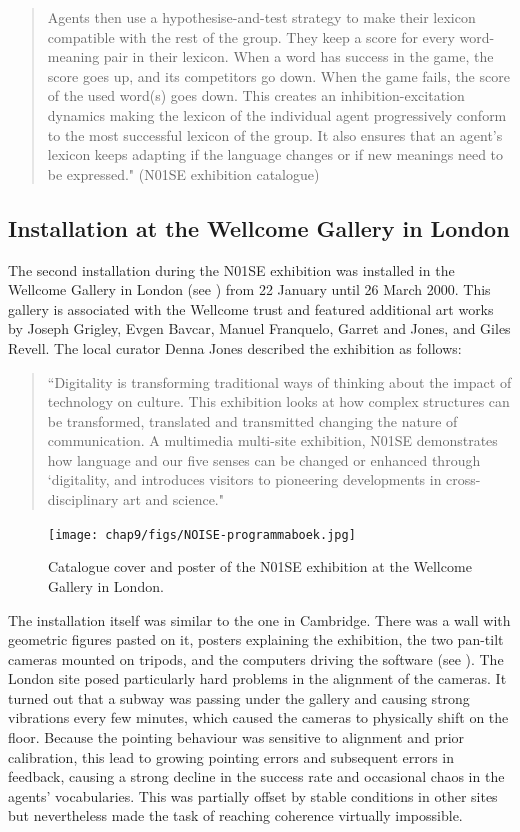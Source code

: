 \begin{quotation}
Agents then use a hypothesise-and-test strategy to make their lexicon compatible with the rest of the group. They keep a score for every word-meaning pair in their lexicon. When a word has success in the game, the score goes up, and its competitors go down. When the game fails, the score of the used word(s) goes down. This creates an inhibition-excitation dynamics making the lexicon of the individual agent progressively conform to the most successful lexicon of the group. It also ensures that an agent's lexicon keeps adapting if the language changes or if new meanings need to be expressed." (N01SE exhibition catalogue)
\end{quotation}

\subsection{Installation at the Wellcome Gallery in London} 

The second installation during the N01SE exhibition was installed in the Wellcome Gallery in London 
(see ) 
from 22 January until 26 March 2000. This gallery is associated with the Wellcome trust and featured additional 
art works by Joseph Grigley, Evgen Bavcar, Manuel Franquelo, Garret and Jones, and Giles Revell. The local curator
Denna Jones described the exhibition as follows: 

\begin{quotation}
``Digitality is transforming traditional ways of thinking about the impact of technology on culture. This exhibition 
looks at how complex structures can be transformed, translated and transmitted changing the nature of communication. 
A multimedia multi-site exhibition, N01SE demonstrates how language and our five senses can be changed or 
enhanced through `digitality, and introduces visitors to pioneering developments in cross-disciplinary art and 
science."
\end{quotation}

\begin{figure}[htbp]
  \centerline{\texttt{[image: chap9/figs/NOISE-programmaboek.jpg]}}
\caption{\label{fig:program}Catalogue cover and poster of the N01SE exhibition at the Wellcome Gallery in London.}
\end{figure}

The installation itself was similar to the one in Cambridge. There was a wall with 
geometric figures pasted on it, posters explaining the exhibition, the two pan-tilt cameras mounted on tripods, 
and the computers driving the software (see ). The London site posed particularly hard 
problems in the alignment of the cameras. 
It turned out that a subway was passing under the gallery and causing strong vibrations 
every few minutes, which caused the cameras to physically shift on the floor. Because the pointing behaviour was sensitive 
to alignment and prior calibration, this lead to growing pointing errors and 
subsequent errors in feedback, causing a strong decline in 
the success rate and occasional chaos in the agents' vocabularies. This was partially offset by stable conditions in 
other sites but nevertheless made the task of reaching coherence virtually impossible. 

